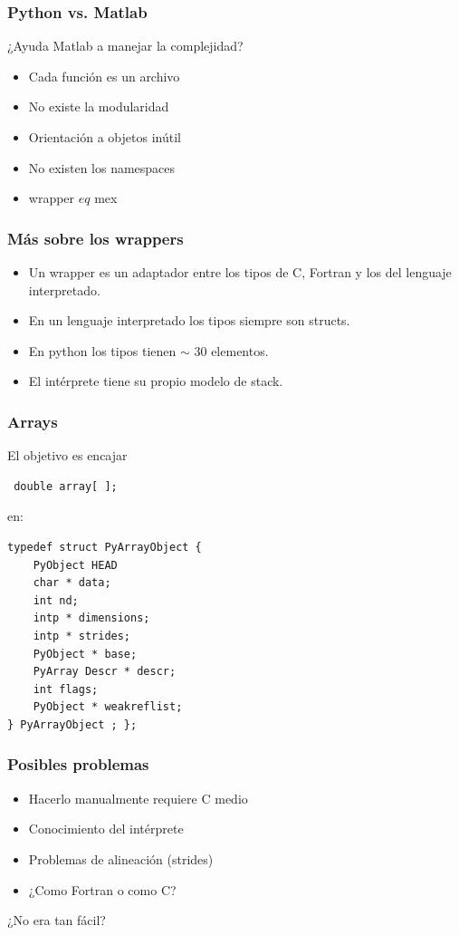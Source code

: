 \documentclass{beamer}
\begin{document}
\begin{frame}
 \frametitle{Python vs. Matlab}
\begin{center}
 ¿Ayuda Matlab a manejar la complejidad?
\end{center}
\begin{itemize}
 \item Cada función es un archivo
 \item No existe la modularidad
 \item Orientación a objetos inútil
 \item No existen los namespaces
 \item wrapper $eq$ mex
\end{itemize}
\end{frame}


\begin{frame}
\frametitle{Más sobre los wrappers}
\begin{itemize}
 \item Un wrapper es un adaptador entre los tipos de C, Fortran y los del lenguaje interpretado.
 \item En un lenguaje interpretado los tipos siempre son structs.
 \item En python los tipos tienen $\sim$ 30 elementos.
 \item El intérprete tiene su propio modelo de stack.
\end{itemize}
\end{frame}

\begin{frame}[containsverbatim]
 \frametitle{Arrays}
El objetivo es encajar
\begin{verbatim}
 double array[ ];
\end{verbatim}
en:
\begin{verbatim}
typedef struct PyArrayObject { 
    PyObject HEAD
    char * data;
    int nd;
    intp * dimensions;
    intp * strides;
    PyObject * base;
    PyArray Descr * descr;
    int flags;
    PyObject * weakreflist;
} PyArrayObject ; };
\end{verbatim}
\end{frame}

\begin{frame}
 \frametitle{Posibles problemas}
\begin{itemize}
 \item Hacerlo manualmente requiere C medio
 \item Conocimiento del intérprete
 \item Problemas de alineación (strides)
 \item ¿Como Fortran o como C?
\end{itemize}
\begin{center}
 ¿No era tan fácil?
\end{center}
\end{frame}
\end{document}
